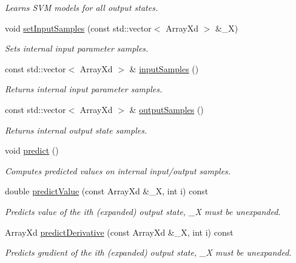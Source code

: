 \begin{DoxyCompactItemize}
\begin{DoxyCompactList}\small\item\em Learns S\-V\-M models for all output states. \end{DoxyCompactList}\item 
void \hyperlink{class_go_s_u_m_1_1_c_analytical_model_a6308bceb0b417036f07f880faf7626d1}{set\-Input\-Samples} (const std\-::vector$<$ Array\-Xd $>$ \&\-\_\-\-X)
\begin{DoxyCompactList}\small\item\em Sets internal input parameter samples. \end{DoxyCompactList}\item 
const std\-::vector$<$ Array\-Xd $>$ \& \hyperlink{class_go_s_u_m_1_1_c_analytical_model_acd5facd13931cdc70a39744bf31ea86c}{input\-Samples} ()
\begin{DoxyCompactList}\small\item\em Returns internal input parameter samples. \end{DoxyCompactList}\item 
const std\-::vector$<$ Array\-Xd $>$ \& \hyperlink{class_go_s_u_m_1_1_c_analytical_model_a2bc7a8158888665abfcdfaef746120e8}{output\-Samples} ()
\begin{DoxyCompactList}\small\item\em Returns internal output state samples. \end{DoxyCompactList}\item 
void \hyperlink{class_go_s_u_m_1_1_c_analytical_model_aece71455392ddef8e4ed2ffbf9b84644}{predict} ()
\begin{DoxyCompactList}\small\item\em Computes predicted values on internal input/output samples. \end{DoxyCompactList}\item 
double \hyperlink{class_go_s_u_m_1_1_c_analytical_model_a04f7ececc316bd19909a890940deac2f}{predict\-Value} (const Array\-Xd \&\-\_\-\-X, int i) const 
\begin{DoxyCompactList}\small\item\em Predicts value of the ith (expanded) output state, \-\_\-\-X must be unexpanded. \end{DoxyCompactList}\item 
Array\-Xd \hyperlink{class_go_s_u_m_1_1_c_analytical_model_a91b45c57a009c7f19dd1a267ab8cb16c}{predict\-Derivative} (const Array\-Xd \&\-\_\-\-X, int i) const 
\begin{DoxyCompactList}\small\item\em Predicts gradient of the ith (expanded) output state, \-\_\-\-X must be unexpanded. \end{DoxyCompactList}\item 

\end{DoxyCompactItemize}
